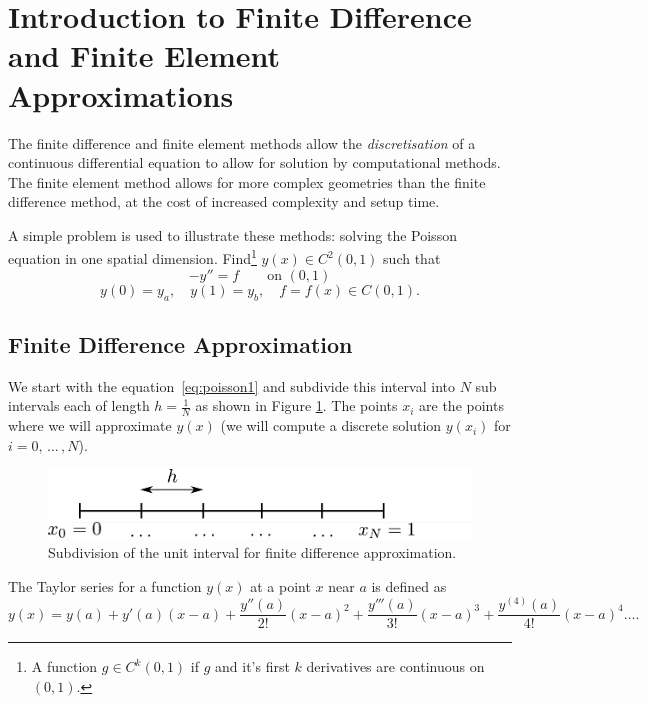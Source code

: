 \section{Introduction to Finite Difference and Finite Element Approximations}
\label{sec:intr-finite-ele-diff}

The finite difference and finite element methods allow the \emph{discretisation} of a continuous differential equation to allow for solution by computational methods. The finite element method allows for more complex geometries than the finite difference method, at the cost of increased complexity and setup time.

A simple problem is used to illustrate these methods: solving the Poisson
equation in one spatial dimension. Find\footnote{A function $g\in C^{k}(0,1)$ if $g$ and it's first $k$ derivatives are continuous on $(0,1)$.} $y(x)\in C^{2}(0,1)$ such that
\begin{equation}
  -y''=f\qquad\text{on }(0,1)
  \label{eq:poisson1}
\end{equation}
\begin{equation*}
  y(0)=y_{a},\quad y(1)=y_{b},\quad f=f(x)\in C(0,1).
\end{equation*}

\subsection{Finite Difference Approximation}
\label{sec:finite-diff-appr}

We start with the equation~\eqref{eq:poisson1} and subdivide this interval into
$N$ sub intervals each of length $h = \frac{1}{N}$ as shown in Figure
\ref{fig:The-subdivision}. The points $x_{i}$ are the points where we will
approximate $y(x)$ (\ie we will compute a discrete solution $y(x_{i})$ for
$i=0, \, \ldots \, ,N$).

\begin{figure}[!ht]
  \center
  \includegraphics[width=1\textwidth]{./images/finite_diff_discretisation}
  \caption{Subdivision of the unit interval for finite difference approximation.}
  \label{fig:The-subdivision}
\end{figure}

The Taylor series for a function $y(x)$ at a point $x$ near $a$
is defined as
\begin{equation*}
  y(x)=y(a)+y'(a)(x-a)+\dfrac{y''(a)}{2!}(x-a)^{2}
  + \dfrac{y'''(a)}{3!}(x-a)^{3}+\dfrac{y^{(4)}(a)}{4!}(x-a)^{4}\ldots.
\end{equation*}

